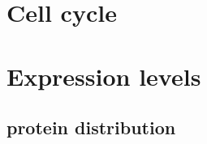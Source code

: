 \section{Cell cycle}


  


\section{Expression levels}




    \subsection{protein distribution}


